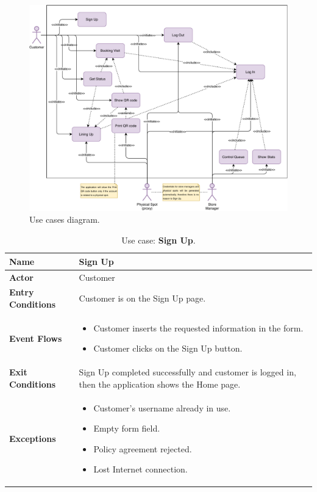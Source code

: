 \begin{figure}[H]
	\centering
	\includegraphics[width=1.0\textwidth]{images/use_cases_diagram.pdf}
	\caption{Use cases diagram.}
\end{figure}

\begin{table}[H]
\centering
\begin{tabular}{| m{} | m{} |} 
	\hline
	\textbf{Name} & Sign Up \\ 
	\hline
	\textbf{Actor} & Customer \\ 
	\hline
	\textbf{Entry Conditions} & Customer is on the Sign Up page. \\ 
	\hline
	\textbf{Event Flows} &
	\begin{itemize}
		\item Customer inserts the requested information in the form.
		\item Customer clicks on the Sign Up button.
	\end{itemize} \\ 
	\hline
	\textbf{Exit Conditions} & Sign Up completed successfully and customer is logged in, then the application shows the Home page. \\ 
	\hline
	\textbf{Exceptions} &
	\begin{itemize}
		\item Customer's username already in use.
		\item Empty form field.
		\item Policy agreement rejected.
		\item Lost Internet connection.
	\end{itemize} \\ 
	\hline
\end{tabular}
\caption{Use case: \textbf{Sign Up}.}
\label{tableSignUp}
\end{table}

